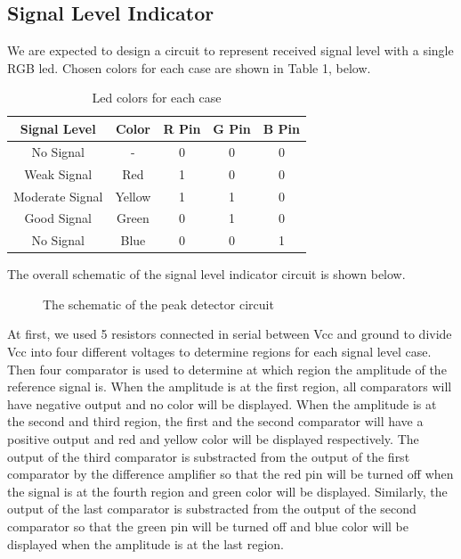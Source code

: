 \documentclass[conference]{IEEEtran}
\begin{document}
\subsection{Signal Level Indicator}
We are expected to design a circuit to represent received signal level with a single RGB led. Chosen colors for 
each case are shown in Table 1, below.
\begin{table}[htbp]
    \caption{Led colors for each case}
    \begin{center}
    \begin{tabular}{|c|c|c|c|c|}
    \hline
    \textbf{Signal Level} & \textbf{Color}& \textbf{R Pin}& \textbf{G Pin}& \textbf{B Pin} \\
    \hline
    No Signal & - & 0 & 0 & 0\\
    \hline
    Weak Signal & Red & 1 & 0 & 0\\
    \hline
    Moderate Signal & Yellow & 1 & 1 & 0\\
    \hline
    Good Signal & Green & 0 & 1 & 0\\
    \hline
    No Signal & Blue & 0 & 0 & 1\\
    \hline
    \end{tabular}
    \label{tab1}
    \end{center}
\end{table}
\par The overall schematic of the signal level indicator circuit is shown below.
\begin{figure}[H]
   \centerline{}
    \caption{The schematic of the peak detector circuit}
\end{figure}
\par At first, we used 5 resistors connected in serial between Vcc and ground to divide Vcc into four different voltages 
to determine regions for each signal level case. 
Then four comparator is used to determine at which region the amplitude of the reference signal is. When the amplitude 
is at the first region, all comparators will have negative output and no color will be displayed. When the amplitude 
is at the second and third region, the first and the second comparator will have a positive output and red and yellow 
color will be displayed respectively. The output of the third comparator is substracted from the output of the first 
comparator by the difference amplifier so that the red pin will be turned off when the signal is at the fourth region 
and green color will be displayed. Similarly, the output of the last comparator is substracted from the output of the 
second comparator so that the green pin will be turned off and blue color will be displayed when the amplitude is at the 
last region.
\end{document}
